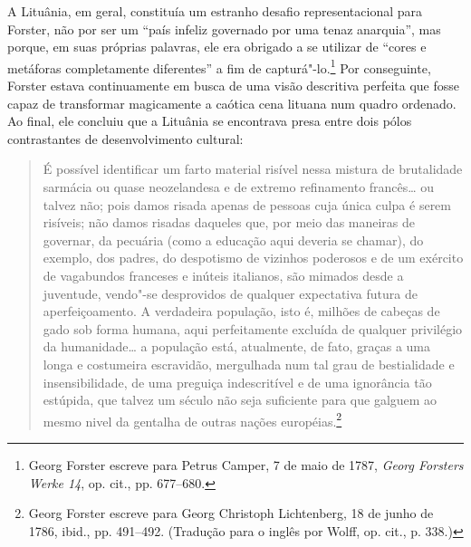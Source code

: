 \asterisc

A Lituânia, em geral, constituía um estranho desafio representacional
para Forster, não por ser um ``país infeliz governado por uma tenaz
anarquia'', mas porque, em suas próprias palavras, ele era obrigado a se
utilizar de ``cores e metáforas completamente diferentes'' a fim de
capturá"-lo.\footnote{Georg Forster escreve para Petrus Camper, 7 de maio
  de 1787, \emph{Georg Forsters Werke 14}, op. cit., pp. 677--680.} Por
conseguinte, Forster estava continuamente em busca de uma visão
descritiva perfeita que fosse capaz de transformar magicamente a caótica
cena lituana num quadro ordenado. Ao final, ele concluiu que a Lituânia
se encontrava presa entre dois pólos contrastantes de desenvolvimento
cultural:

\begin{quote}
É possível identificar um farto material risível nessa mistura de
brutalidade sarmácia ou quase neozelandesa e de extremo refinamento
francês\ldots{} ou talvez não; pois damos risada apenas de pessoas cuja
única culpa é serem risíveis; não damos risadas daqueles que, por meio
das maneiras de governar, da pecuária (como a educação aqui deveria se
chamar), do exemplo, dos padres, do despotismo de vizinhos poderosos e
de um exército de vagabundos franceses e inúteis italianos, são mimados
desde a juventude, vendo"-se desprovidos de qualquer expectativa futura
de aperfeiçoamento. A verdadeira população, isto é, milhões de cabeças
de gado sob forma humana, aqui perfeitamente excluída de qualquer
privilégio da humanidade\ldots{} a população está, atualmente, de fato,
graças a uma longa e costumeira escravidão, mergulhada num tal grau de
bestialidade e insensibilidade, de uma preguiça indescritível e de uma
ignorância tão estúpida, que talvez um século não seja suficiente para
que galguem ao mesmo nivel da gentalha de outras nações
européias.\footnote{Georg Forster escreve para Georg Christoph
  Lichtenberg, 18 de junho de 1786, ibid., pp. 491--492. (Tradução para o
  inglês por Wolff, op. cit., p. 338.)}
\end{quote}

